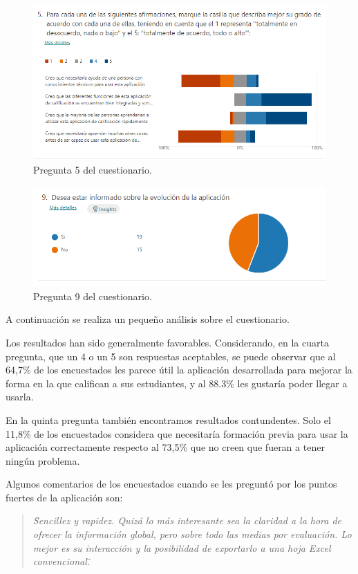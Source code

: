 \begin{figure}[h]
\centering\includegraphics[width=1\linewidth]{figs/pregunta5.png}
\caption{Pregunta 5 del cuestionario.}
\label{Fig:pregunta5}
\end{figure}

\begin{figure}[h]
\centering\includegraphics[width=1\linewidth]{figs/pregunta9.png}
\caption{Pregunta 9 del cuestionario.}
\label{Fig:pregunta9}
\end{figure}

A continuación se realiza un pequeño análisis sobre el cuestionario.

Los resultados han sido generalmente favorables. Considerando, en la cuarta pregunta, que un 4 o un 5 son respuestas aceptables, se puede observar que al 64,7\% de los encuestados les parece útil la aplicación desarrollada para mejorar la forma en la que califican a sus estudiantes, y al 88.3\% les gustaría poder llegar a usarla.

En la quinta pregunta también encontramos resultados contundentes. Solo el 11,8\% de los encuestados considera que necesitaría formación previa para usar la aplicación correctamente respecto al 73,5\% que no creen que fueran a tener ningún problema.

Algunos comentarios de los encuestados cuando se les preguntó por los puntos fuertes de la aplicación son:
\begin{quote}
\textit{\"Sencillez y rapidez. Quizá lo más interesante sea la claridad a la hora de ofrecer la información global, pero sobre todo las medias por evaluación. Lo mejor es su interacción y la posibilidad de exportarlo a una hoja Excel convencional.\"}
\end{quote}


